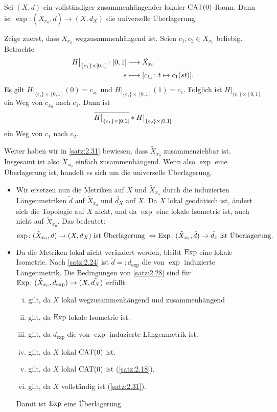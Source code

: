 \begin{satz}
\label{satz:2.33}
	Sei $(X,d)$ ein vollständiger zusammenhängender lokaler $\operatorname{CAT(0)}$-Raum. 
	Dann ist $\exp\colon (\tilde{X}_{x_0},d) \rightarrow (X,d_X)$ die universelle Überlagerung.
\end{satz}

\begin{beweis}
	Zeige zuerst, dass $\tilde{X}_{x_0}$ wegzusammenhängend ist.
	Seien $c_1,c_2 \in \tilde{X}_{x_0}$ beliebig.
	Betrachte
	\begin{align*}
		H \big|_{\{c_1\} \times [0,1]} \colon [0,1] &\longrightarrow \tilde{X}_{x_0} \\
		s &\longmapsto \benbrace*{c_{1_s} \colon t \mapsto c_1(st)}.
	\end{align*}
	Es gilt $H \big|_{\{c_1\} \times [0,1]}(0) = c_{x_0}$ und $H \big|_{\{c_1\} \times [0,1]}(1) = c_1$.
	Folglich ist $H\big|_{\{c_1\} \times [0,1]}$ ein Weg von $c_{x_0}$ nach $c_1$.
	Dann ist
	\[
		\overline{H \big|_{\{c_1\} \times [0,1]}} * H \big|_{\{c_2\} \times [0,1]}
	\] 
	ein Weg von $c_1$ nach $c_2$.
	
	Weiter haben wir in \autoref{satz:2.31} bewiesen, dass $\tilde{X}_{x_0}$ zusammenziehbar ist.
	Insgesamt ist also $\tilde{X}_{x_0}$ einfach zusammenhängend.
	Wenn also $\exp$ eine Überlagerung ist, handelt es sich um die universelle Überlagerung.
	\newpage
	\begin{itemize}
		\item Wir ersetzen nun die Metriken auf $X$ und $\tilde{X}_{x_0}$ durch die induzierten Längenmetriken $\tilde{d}$ auf $\tilde{X}_{x_0}$ und $\tilde{d_X}$ auf $X$.
		Da $X$ lokal geodätisch ist, ändert sich die Topologie auf $X$ nicht, und da $\exp$ eine lokale Isometrie ist, auch nicht auf $\tilde{X}_{x_0}$.
		Das bedeutet:
		\[
			\exp\colon (\tilde{X}_{x_0},d) \rightarrow (X,d_X) \text{ ist Überlagerung } \Leftrightarrow \operatorname{Exp}\colon (\tilde{X}_{x_0},\tilde{d}) \rightarrow \tilde{d_x} \text{ ist Überlagerung.}
		\]
		\item Da die Metriken lokal nicht verändert werden, bleibt $\operatorname{Exp}$ eine lokale Isometrie.
		Nach \autoref{satz:2.24} ist $\tilde{d} =: d_{\exp}$ die von $\exp$ induzierte Längenmetrik.
		Die Bedingungen von \autoref{satz:2.28} sind für \linebreak $\operatorname{Exp}\colon (\tilde{X}_{x_0},d_{\exp}) \rightarrow (X,\tilde{d_X})$ erfüllt:
		\begin{enumerate}[(i)]
			\item gilt, da $X$ lokal wegzusammenhängend und zusammenhängend
			\item gilt, da $\operatorname{Exp}$ lokale Isometrie ist.
			\item gilt, da $d_{\exp}$ die von $\exp$ induzierte Längenmetrik ist.
			\item gilt, da $X$ lokal $\operatorname{CAT(0)}$ ist.
			\item gilt, da $X$ lokal $\operatorname{CAT(0)}$ ist (\autoref{satz:2.18}).
			\item gilt, da $X$ vollständig ist (\autoref{satz:2.31}).
		\end{enumerate}
		Damit ist $\operatorname{Exp}$ eine Überlagerung. \qedhere
	\end{itemize}
\end{beweis}

